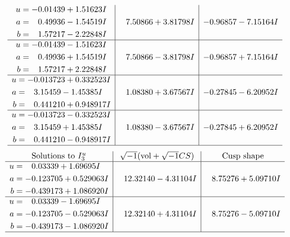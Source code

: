 \documentclass[1p]{elsarticle_modified}
\theoremstyle{definition}
\newcommand{\I}{\sqrt{-1}}
\begin{document}
$$\begin{array}{c|c|c}
\begin{aligned}
u &= -0.01439 + 1.51623 I \\
a &= \phantom{-}0.49936 - 1.54519 I \\
b &= \phantom{-}1.57217 - 2.22848 I\end{aligned}
 & \phantom{-}7.50866 + 3.81798 I & -0.96857 - 7.15164 I \\ \hline\begin{aligned}
u &= -0.01439 - 1.51623 I \\
a &= \phantom{-}0.49936 + 1.54519 I \\
b &= \phantom{-}1.57217 + 2.22848 I\end{aligned}
 & \phantom{-}7.50866 - 3.81798 I & -0.96857 + 7.15164 I \\ \hline\begin{aligned}
u &= -0.013723 + 0.332523 I \\
a &= \phantom{-}3.15459 - 1.45385 I \\
b &= \phantom{-}0.441210 + 0.948917 I\end{aligned}
 & \phantom{-}1.08380 + 3.67567 I & -0.27845 - 6.20952 I \\ \hline\begin{aligned}
u &= -0.013723 - 0.332523 I \\
a &= \phantom{-}3.15459 + 1.45385 I \\
b &= \phantom{-}0.441210 - 0.948917 I\end{aligned}
 & \phantom{-}1.08380 - 3.67567 I & -0.27845 + 6.20952 I\\
 \hline 
 \end{array}$$\newpage$$\begin{array}{c|c|c}  
\text{Solutions to }I^u_{3}& \I (\text{vol} + \sqrt{-1}CS) & \text{Cusp shape}\\
 \hline 
\begin{aligned}
u &= \phantom{-}0.03339 + 1.69695 I \\
a &= -0.123705 + 0.529063 I \\
b &= -0.439173 + 1.086920 I\end{aligned}
 & \phantom{-}12.32140 - 4.31104 I & \phantom{-}8.75276 + 5.09710 I \\ \hline\begin{aligned}
u &= \phantom{-}0.03339 - 1.69695 I \\
a &= -0.123705 - 0.529063 I \\
b &= -0.439173 - 1.086920 I\end{aligned}
 & \phantom{-}12.32140 + 4.31104 I & \phantom{-}8.75276 - 5.09710 I\\
 \hline 
 \end{array}$$\newpage\newpage\renewcommand{\arraystretch}{1}
\end{document}
